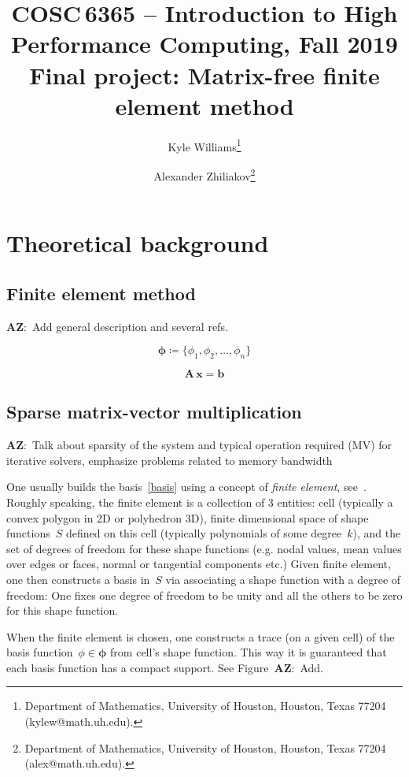 \documentclass[12pt]{article}
\title{COSC\,6365 -- Introduction to High Performance Computing, Fall 2019\\Final project: \textbf{Matrix-free finite element method}}
\author{
	Kyle Williams\thanks{Department of Mathematics, University of Houston, Houston, Texas 77204 (kylew@math.uh.edu).} \and
	Alexander Zhiliakov\thanks{Department of Mathematics, University of Houston, Houston, Texas 77204 (alex@math.uh.edu).}
}
\newcommand{\vect}[1]{\boldsymbol{\mathbf{#1}}}
\newcommand{\AZ}[1]{{\color{red}\textbf{AZ}:~#1}}
\newcommand{\dimSize}{n}
\begin{document}
	
\maketitle

\tableofcontents
\vfill
\clearpage
\let\oldtabular\tabular
\renewcommand{\tabular}[1][1.5]{\def\arraystretch{#1}\oldtabular}
\renewcommand\arraystretch{1.3}

\section{Theoretical background}

\subsection{Finite element method}

\AZ{Add general description and several refs.}

\begin{equation}\label{basis}
	\vect\phi \coloneqq \{ \phi_1, \phi_2, \dots, \phi_\dimSize \}
\end{equation}

\begin{equation}\label{system}
	\vect A\,\vect x = \vect b
\end{equation}

\subsection{Sparse matrix-vector multiplication}

\AZ{Talk about sparsity of the system and typical operation required (MV) for iterative solvers, emphasize problems related to memory bandwidth}

One usually builds the basis~\eqref{basis} using a concept of \textit{finite element}, see~\cite{ciarlet2002finite}. Roughly speaking, the finite element is a collection of 3 entities: cell (typically a convex polygon in 2D or polyhedron 3D), finite dimensional space of shape functions~$S$ defined on this cell (typically polynomials of some degree~$k$), and the set of degrees of freedom for these shape functions (e.g. nodal values, mean values over edges or faces, normal or tangential components etc.) Given finite element, one then constructs a basis in~$S$ via associating a shape function with a degree of freedom: One fixes one degree of freedom to be unity and all the others to be zero for this shape function. 

When the finite element is chosen, one constructs a trace (on a given cell) of the basis function~${\phi \in \vect\phi}$ from cell's shape function. This way it is guaranteed that each basis function has a compact support. See Figure~\AZ{Add.}
\end{document}
